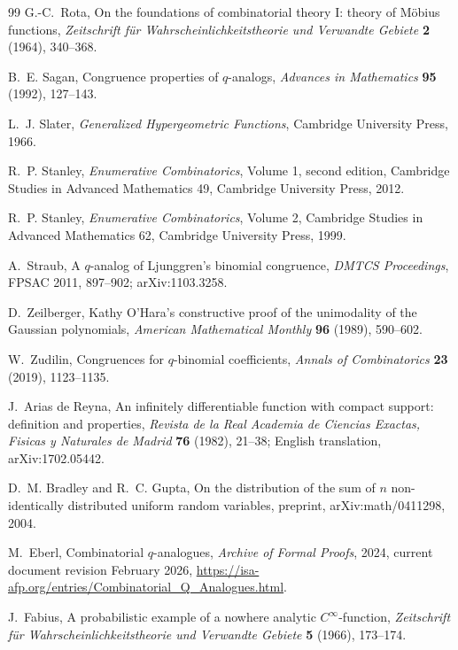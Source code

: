 \documentclass[11pt,a4paper,oneside,openany]{book}
\theoremstyle{definition}
\theoremstyle{remark}
\begin{document}
\begin{thebibliography}{99}
G.-C.~Rota,
On the foundations of combinatorial theory I: theory of M\"obius functions,
\emph{Zeitschrift f\"ur Wahrscheinlichkeitstheorie und Verwandte Gebiete} \textbf{2} (1964), 340--368.

B.~E. Sagan,
Congruence properties of $q$-analogs,
\emph{Advances in Mathematics} \textbf{95} (1992), 127--143.

L.~J. Slater,
\emph{Generalized Hypergeometric Functions},
Cambridge University Press, 1966.

R.~P. Stanley,
\emph{Enumerative Combinatorics}, Volume 1, second edition,
Cambridge Studies in Advanced Mathematics 49, Cambridge University Press, 2012.

R.~P. Stanley,
\emph{Enumerative Combinatorics}, Volume 2,
Cambridge Studies in Advanced Mathematics 62, Cambridge University Press, 1999.

A.~Straub,
A $q$-analog of Ljunggren's binomial congruence,
\emph{DMTCS Proceedings}, FPSAC 2011, 897--902; arXiv:1103.3258.

D.~Zeilberger,
Kathy O'Hara's constructive proof of the unimodality of the Gaussian polynomials,
\emph{American Mathematical Monthly} \textbf{96} (1989), 590--602.

W.~Zudilin,
Congruences for $q$-binomial coefficients,
\emph{Annals of Combinatorics} \textbf{23} (2019), 1123--1135.

J.~Arias de Reyna,
An infinitely differentiable function with compact support: definition and properties,
\emph{Revista de la Real Academia de Ciencias Exactas, Fisicas y Naturales de Madrid} \textbf{76} (1982), 21--38;
English translation, arXiv:1702.05442.

D.~M. Bradley and R.~C. Gupta,
On the distribution of the sum of $n$ non-identically distributed uniform random variables,
preprint, arXiv:math/0411298, 2004.

M.~Eberl,
Combinatorial $q$-analogues,
\emph{Archive of Formal Proofs}, 2024, current document revision February 2026,
\url{https://isa-afp.org/entries/Combinatorial_Q_Analogues.html}.

J.~Fabius,
A probabilistic example of a nowhere analytic $C^\infty$-function,
\emph{Zeitschrift f\"ur Wahrscheinlichkeitstheorie und Verwandte Gebiete} \textbf{5} (1966), 173--174.


\end{thebibliography}
\end{document}
